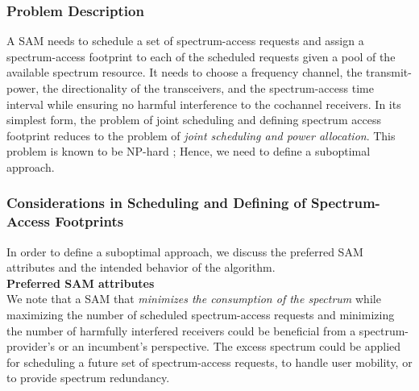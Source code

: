 \documentclass[12pt, draftclsnofoot, onecolumn]{IEEEtran}
\begin{document}
\subsubsection{Problem Description}
A SAM needs to schedule a set of spectrum-access requests and assign a spectrum-access footprint to each of the scheduled requests given a pool of the available spectrum resource. It needs to choose a frequency channel, the transmit-power, the directionality of the transceivers, and the spectrum-access time interval while ensuring no harmful interference to the cochannel receivers. In its simplest form, the problem of joint scheduling and defining spectrum access footprint reduces to the problem of \textit{joint scheduling and power allocation}. This problem is known to be NP-hard \cite{jcpa_nphard}; Hence, we need to define a suboptimal approach.  

\subsubsection{Considerations in Scheduling and Defining of Spectrum-Access Footprints}
In order to define a suboptimal approach, we discuss the preferred SAM attributes and the intended behavior of the algorithm.\\
\noindent
\textbf{Preferred SAM attributes}\\
\noindent
We note that a SAM that \textit{minimizes the consumption of the spectrum} while maximizing the number of scheduled spectrum-access requests and minimizing the number of harmfully interfered receivers could be beneficial from a spectrum-provider's or an incumbent's perspective. The excess spectrum could be applied for scheduling a future set of spectrum-access requests, to handle user mobility, or to provide spectrum redundancy. 
\end{document}
